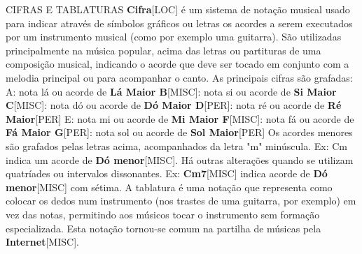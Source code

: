 \documentclass[a4paper,12pt]{article}
\begin{document}
CIFRAS E TABLATURAS \textbf{Cifra}\textsc{[LOC]} é um sistema de notação musical usado para indicar através de símbolos gráficos ou letras os acordes a serem executados por um instrumento musical (como por exemplo uma guitarra). São utilizadas principalmente na música popular, acima das letras ou partituras de uma composição musical, indicando o acorde que deve ser tocado em conjunto com a melodia principal ou para acompanhar o canto. As principais cifras são grafadas: A: nota lá ou acorde de \textbf{Lá Maior B}\textsc{[MISC]}: nota si ou acorde de \textbf{Si Maior C}\textsc{[MISC]}: nota dó ou acorde de \textbf{Dó Maior D}\textsc{[PER]}: nota ré ou acorde de \textbf{Ré Maior}\textsc{[PER]} E: nota mi ou acorde de \textbf{Mi Maior F}\textsc{[MISC]}: nota fá ou acorde de \textbf{Fá Maior G}\textsc{[PER]}: nota sol ou acorde de \textbf{Sol Maior}\textsc{[PER]} Os acordes menores são grafados pelas letras acima, acompanhados da letra "m" minúscula. Ex: Cm indica um acorde de \textbf{Dó menor}\textsc{[MISC]}. Há outras alterações quando se utilizam quatríades ou intervalos dissonantes. Ex: \textbf{Cm7}\textsc{[MISC]} indica acorde de \textbf{Dó menor}\textsc{[MISC]} com sétima. A tablatura é uma notação que representa como colocar os dedos num instrumento (nos trastes de uma guitarra, por exemplo) em vez das notas, permitindo aos músicos tocar o instrumento sem formação especializada. Esta notação tornou-se comum na partilha de músicas pela \textbf{Internet}\textsc{[MISC]}.
\end{document}
